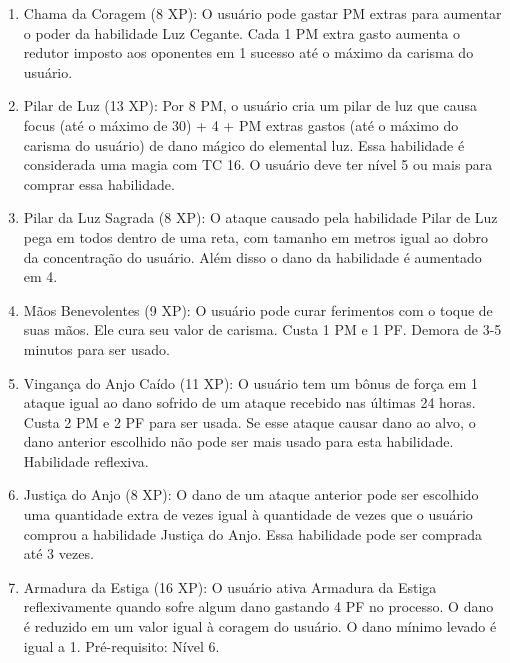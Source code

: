\begin{enumerate}
 	\item Chama da Coragem (8 XP): O usuário pode gastar PM extras para aumentar o poder da habilidade Luz Cegante. Cada 1 PM extra gasto aumenta o redutor imposto aos oponentes em 1 sucesso até o máximo da carisma do usuário.
 
 	\item Pilar de Luz (13 XP): Por 8 PM, o usuário cria um pilar de luz que causa focus (até o máximo de 30) + 4 + PM extras gastos (até o máximo do carisma do usuário) de dano mágico do elemental luz. Essa habilidade é considerada uma magia com TC 16. O usuário deve ter nível 5 ou mais para comprar essa habilidade.
 	 	
 	\item Pilar da Luz Sagrada (8 XP): O ataque causado pela habilidade Pilar de Luz pega em todos dentro de uma reta, com tamanho em metros igual ao dobro da concentração do usuário. Além disso o dano da habilidade é aumentado em 4.

 	\item Mãos Benevolentes (9 XP): O usuário pode curar ferimentos com o toque de suas mãos. Ele cura seu valor de carisma. Custa 1 PM e 1 PF. Demora de 3-5 minutos para ser usado.
 	
 	\item Vingança do Anjo Caído (11 XP): O usuário tem um bônus de força em 1 ataque igual ao dano sofrido de um ataque recebido nas últimas 24 horas. Custa 2 PM e 2 PF para ser usada. Se esse ataque causar dano ao alvo, o dano anterior escolhido não pode ser mais usado para esta habilidade. Habilidade reflexiva. 
 	
 
 \item Justiça do Anjo (8 XP): O dano de um ataque anterior pode ser escolhido uma quantidade extra de vezes igual à quantidade de vezes que o usuário comprou a habilidade Justiça do Anjo. Essa habilidade pode ser comprada até 3 vezes.

	\item Armadura da Estiga (16 XP): O usuário ativa Armadura da Estiga reflexivamente quando sofre algum dano gastando 4 PF no processo. O dano é reduzido em um valor igual à coragem do usuário. O dano mínimo levado é igual a 1. Pré-requisito: Nível 6. 


\end{enumerate}
